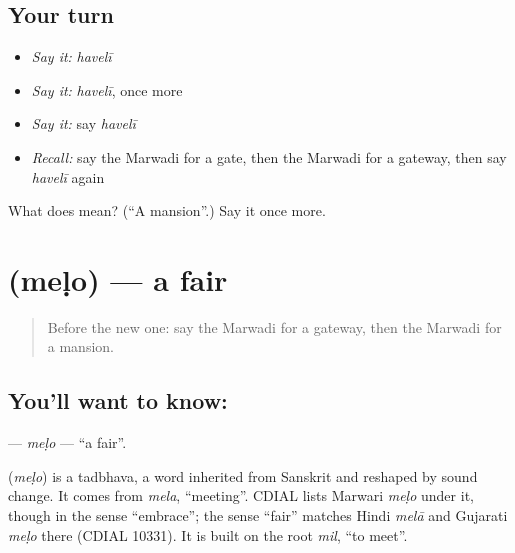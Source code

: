 \subsection*{Your turn}
\begin{itemize}
\raggedright
  \item \emph{Say it:} \emph{havelī}
  \item \emph{Say it:} \emph{havelī}, once more
  \item \emph{Say it:} say \emph{havelī}
  \item \emph{Recall:} say the Marwadi for a gate, then the Marwadi for a gateway, then say \emph{havelī} again
\end{itemize}

\begin{tcolorbox}[breakable,colback=teal!4,colframe=teal!35!black,title={Before you move on}]
What does  mean? (\textquotedblleft{}A mansion\textquotedblright{}.) Say it once more.
\end{tcolorbox}
\section[\texorpdfstring{\mw{मेळो} (meḷo)}{मेळो (meḷo)}]{ (meḷo) — a fair}

\label{lesson:MW-C100-melo}



\begin{quote}
Before the new one: say the Marwadi for a gateway, then the Marwadi for a mansion.
\end{quote}

\subsection*{You'll want to know: }
\textbf{} — \emph{meḷo} — \textquotedblleft{}a fair\textquotedblright{}.

\begin{cousinweb}
\textbf{} (\emph{meḷo}) is a tadbhava, a word inherited from Sanskrit and reshaped by sound change. It comes from \emph{mela}, \textquotedblleft{}meeting\textquotedblright{}. CDIAL lists Marwari \emph{meḷo} under it, though in the sense \textquotedblleft{}embrace\textquotedblright{}; the sense \textquotedblleft{}fair\textquotedblright{} matches Hindi \emph{melā} and Gujarati \emph{meḷo} there (CDIAL 10331). It is built on the root \emph{mil}, \textquotedblleft{}to meet\textquotedblright{}.
\end{cousinweb}

